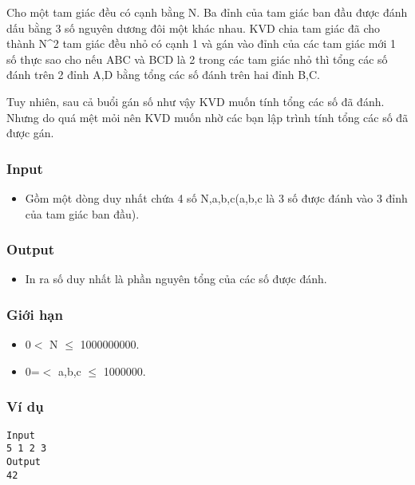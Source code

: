 



   Cho một tam giác đều có cạnh bằng N. Ba đỉnh của tam giác ban đầu được đánh dấu bằng 3 số nguyên dương đôi một khác nhau. KVD chia tam giác đã cho thành N\textasciicircum2 tam giác đều nhỏ có cạnh 1 và gán vào đỉnh của các tam giác mới 1 số thực sao cho nếu ABC và BCD là 2 trong các tam giác nhỏ thì tổng các số đánh trên 2 đỉnh A,D bằng tổng các số đánh trên hai đỉnh B,C.  

   Tuy nhiên, sau cả buổi gán số như vậy KVD muốn tính tổng các số đã đánh. Nhưng do quá mệt mỏi nên KVD muốn nhờ các bạn lập trình tính tổng các số đã được gán.  

\subsubsection{   Input  }
\begin{itemize}
	\item     Gồm một dòng duy nhất chứa 4 số N,a,b,c(a,b,c là 3 số được đánh vào 3 đỉnh của tam giác ban đầu).   
\end{itemize}

\subsubsection{   Output  }
\begin{itemize}
	\item     In ra số duy nhất là phần nguyên tổng của các số được đánh.   
\end{itemize}

\subsubsection{   Giới hạn  }
\begin{itemize}
	\item     0$<$ N  $\le$ 1000000000.   
	\item     0=$<$ a,b,c  $\le$ 1000000.   
\end{itemize}

\subsubsection{   Ví dụ  }
\begin{verbatim}
Input
5 1 2 3
Output
42
\end{verbatim}
